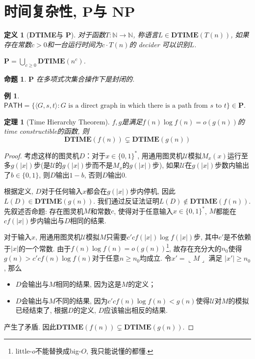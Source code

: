 \documentclass[8pt]{article}
\theoremstyle{compact}
\newtheorem{theorem}{定理}[section]
\newtheorem{definition}{定义}[section]
\newtheorem{proposition}{命题}[section]
\newtheorem{example}{例}[section]
\def\ge{\geqslant}
\def\rep#1{\llcorner{#1}\lrcorner}
\def\DTIME{\textbf{DTIME}}
\def\P{\textbf{P}}
\def\NP{\textbf{NP}}
\begin{document}
\newpage
\section{时间复杂性, \P 与 \NP}
\begin{definition}[\DTIME 与 \P]
	对于函数$T: \mathbb N \to \mathbb N$, 称语言$L \in \DTIME(T(n))$, 如果存在常数$c > 0$和一台运行时间为$c \cdot T(n)$的 decider 可以识别$L$. 

	$\P = \bigcup_{c \ge 0}\DTIME(n^c)$. 
\end{definition}
\begin{proposition}
	$\P$ 在多项式次集合操作下是封闭的.
\end{proposition}
\begin{example}
	$\textsf{PATH} = \{ \langle G, s, t\rangle : G \textrm{ is a direct graph in which there is a path from }s \textrm{ to } t\} \in \P.$
\end{example}
\begin{theorem}[Time Hierarchy Theorem]
	$f, g$是满足$f(n) \log f(n) = o(g(n))$的time constructible的函数, 则
	$$\DTIME(f(n)) \subsetneq \DTIME(g(n))$$
	\label{time_hierarchy_thm}
\end{theorem}
\begin{proof}
	考虑这样的图灵机$D$：对于$x \in \{0, 1\}^*$, 用通用图灵机$\mathcal{U}$模拟$M_x(x)$运行至多$g(|x|)$步(是$\mathcal U$的$g(|x|)$步而不是$M_x$的$g(|x|)$步), 如果$\mathcal{U}$在$g(|x|)$步数内输出了$b \in \{0, 1\}$, 则$D$输出$1-b$, 否则$D$输出$0$. 

	根据定义, $D$对于任何输入$x$都会在$g(|x|)$步内停机, 因此$L(D) \in \DTIME(g(n))$. 我们通过反证法证明$L(D) \notin \DTIME(f(n))$. 先叙述否命题: 存在图灵机$M$和常数$c$, 使得对于任意输入$x \in \{0, 1\}^*$, $M$都能在$cf(|x|)$步内输出与$D$相同的结果. 

	对于输入$x$, 用通用图灵机$\mathcal{U}$模拟$M$只需要$c'cf(|x|)\log f(|x|)$步, 其中$c'$是不依赖于$|x|$的一个常数. 由于$f(n) \log f(n) = o(g(n))$\footnote{little-$o$不能替换成big-$O$, 我只能说懂的都懂. }, 故存在充分大的$n_0$使得$g(n) > c'cf(n) \log f(n)$对于任意$n \ge n_0$均成立. 令$x' = \rep{M}$ 满足 $|x'| \ge n_0$, 那么
	\begin{itemize}
		\item $D$会输出与$M$相同的结果, 因为这是$M$的定义；
		\item $D$会输出与$M$不同的结果, 因为$c'cf(n)\log f(n) < g(n)$使得$\mathcal U$对$M$的模拟已经结束了, 根据$D$的定义, $D$应该输出相反的结果. 
	\end{itemize}

	产生了矛盾. 因此$\DTIME(f(n)) \subsetneq \DTIME(g(n))$. 
\end{proof}
\end{document}
